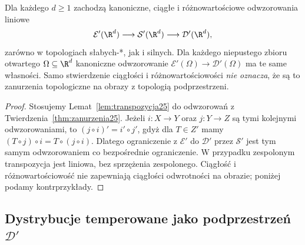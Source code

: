 \begin{wniosek}
\label{cor:dual-lancuch25}
Dla każdego $d\ge1$ zachodzą kanoniczne, ciągłe i
różnowartościowe odwzorowania liniowe
\[
 \mathcal E'(\R^d)\longrightarrow\mathcal S'(\R^d)
 \longrightarrow\mathcal D'(\R^d),
\]
zarówno w topologiach słabych-*, jak i silnych.
Dla każdego niepustego zbioru otwartego $\Omega\subseteq\R^d$
kanoniczne odwzorowanie
$\mathcal E'(\Omega)\to\mathcal D'(\Omega)$
ma te same własności. Samo stwierdzenie ciągłości i
różnowartościowości \emph{nie oznacza}, że są to zanurzenia
topologiczne na obrazy z topologią podprzestrzeni.
\end{wniosek}
\begin{proof}
Stosujemy Lemat~\ref{lem:transpozycja25} do odwzorowań
z Twierdzenia~\ref{thm:zanurzenia25}. Jeżeli $i:X\to Y$
oraz $j:Y\to Z$ są tymi kolejnymi odwzorowaniami,
to $(j\circ i)'=i'\circ j'$, gdyż dla $T\in Z'$
mamy $(T\circ j)\circ i=T\circ(j\circ i)$.
Dlatego ograniczenie z $\mathcal E'$ do $\mathcal D'$
przez $\mathcal S'$ jest tym samym odwzorowaniem co
bezpośrednie ograniczenie. W przypadku zespolonym
transpozycja jest liniowa, bez sprzężenia zespolonego.
Ciągłość i różnowartościowość nie zapewniają ciągłości
odwrotności na obrazie; poniżej podamy kontrprzykłady.
\end{proof}
\subsection{Dystrybucje temperowane jako podprzestrzeń \texorpdfstring{$\mathcal D'$}{D'}}

